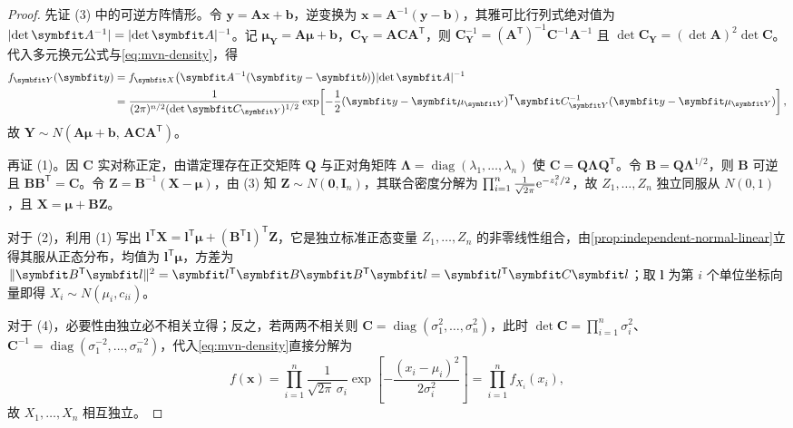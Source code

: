 \begin{proof}
先证 (3) 中的可逆方阵情形。令 $\bm{y}=\bm{A}\bm{x}+\bm{b}$，逆变换为 $\bm{x}=\bm{A}^{-1}(\bm{y}-\bm{b})$，其雅可比行列式绝对值为 $\abs{\det\bm{A}^{-1}}=\abs{\det\bm{A}}^{-1}$。记 $\bm{\mu}_{\bm{Y}}=\bm{A}\bm{\mu}+\bm{b}$，$\bm{C}_{\bm{Y}}=\bm{A}\bm{C}\bm{A}^{\mathsf{T}}$，则 $\bm{C}_{\bm{Y}}^{-1}=(\bm{A}^{\mathsf{T}})^{-1}\bm{C}^{-1}\bm{A}^{-1}$ 且 $\det\bm{C}_{\bm{Y}}=(\det\bm{A})^2\det\bm{C}$。代入多元换元公式与\eqref{eq:mvn-density}，得
\[
\begin{aligned}
  f_{\bm{Y}}(\bm{y})&=f_{\bm{X}}\bigl(\bm{A}^{-1}(\bm{y}-\bm{b})\bigr)\abs{\det\bm{A}}^{-1}\\
  &=\frac{1}{(2\pi)^{n/2}(\det\bm{C}_{\bm{Y}})^{1/2}}
    \exp\!\left[-\frac{1}{2}(\bm{y}-\bm{\mu}_{\bm{Y}})^{\mathsf{T}}\bm{C}_{\bm{Y}}^{-1}(\bm{y}-\bm{\mu}_{\bm{Y}})\right],
\end{aligned}
\]
故 $\bm{Y}\sim N(\bm{A}\bm{\mu}+\bm{b},\,\bm{A}\bm{C}\bm{A}^{\mathsf{T}})$。

再证 (1)。因 $\bm{C}$ 实对称正定，由谱定理存在正交矩阵 $\bm{Q}$ 与正对角矩阵 $\bm{\Lambda}=\operatorname{diag}(\lambda_1,\ldots,\lambda_n)$ 使 $\bm{C}=\bm{Q}\bm{\Lambda}\bm{Q}^{\mathsf{T}}$。令 $\bm{B}=\bm{Q}\bm{\Lambda}^{1/2}$，则 $\bm{B}$ 可逆且 $\bm{B}\bm{B}^{\mathsf{T}}=\bm{C}$。令 $\bm{Z}=\bm{B}^{-1}(\bm{X}-\bm{\mu})$，由 (3) 知 $\bm{Z}\sim N(\bm{0},\bm{I}_n)$，其联合密度分解为 $\prod_{i=1}^{n}\frac{1}{\sqrt{2\pi}}\mathrm{e}^{-z_i^2/2}$，故 $Z_1,\ldots,Z_n$ 独立同服从 $N(0,1)$，且 $\bm{X}=\bm{\mu}+\bm{B}\bm{Z}$。

对于 (2)，利用 (1) 写出 $\bm{l}^{\mathsf{T}}\bm{X}=\bm{l}^{\mathsf{T}}\bm{\mu}+(\bm{B}^{\mathsf{T}}\bm{l})^{\mathsf{T}}\bm{Z}$，它是独立标准正态变量 $Z_1,\ldots,Z_n$ 的非零线性组合，由\cref{prop:independent-normal-linear}立得其服从正态分布，均值为 $\bm{l}^{\mathsf{T}}\bm{\mu}$，方差为 $\norm{\bm{B}^{\mathsf{T}}\bm{l}}^2=\bm{l}^{\mathsf{T}}\bm{B}\bm{B}^{\mathsf{T}}\bm{l}=\bm{l}^{\mathsf{T}}\bm{C}\bm{l}$；取 $\bm{l}$ 为第 $i$ 个单位坐标向量即得 $X_i\sim N(\mu_i,c_{ii})$。

对于 (4)，必要性由独立必不相关立得；反之，若两两不相关则 $\bm{C}=\operatorname{diag}(\sigma_1^2,\ldots,\sigma_n^2)$，此时 $\det\bm{C}=\prod_{i=1}^{n}\sigma_i^2$、$\bm{C}^{-1}=\operatorname{diag}(\sigma_1^{-2},\ldots,\sigma_n^{-2})$，代入\eqref{eq:mvn-density}直接分解为
\[
  f(\bm{x})=\prod_{i=1}^{n}\frac{1}{\sqrt{2\pi}\,\sigma_i}\exp\!\left[-\frac{(x_i-\mu_i)^2}{2\sigma_i^2}\right]
  =\prod_{i=1}^{n}f_{X_i}(x_i),
\]
故 $X_1,\ldots,X_n$ 相互独立。
\end{proof}


